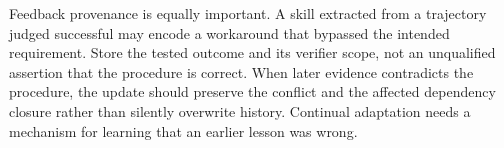 Feedback provenance is equally important. A skill extracted from a trajectory judged successful may encode a workaround that bypassed the intended requirement. Store the tested outcome and its verifier scope, not an unqualified assertion that the procedure is correct. When later evidence contradicts the procedure, the update should preserve the conflict and the affected dependency closure rather than silently overwrite history. Continual adaptation needs a mechanism for learning that an earlier lesson was wrong.

